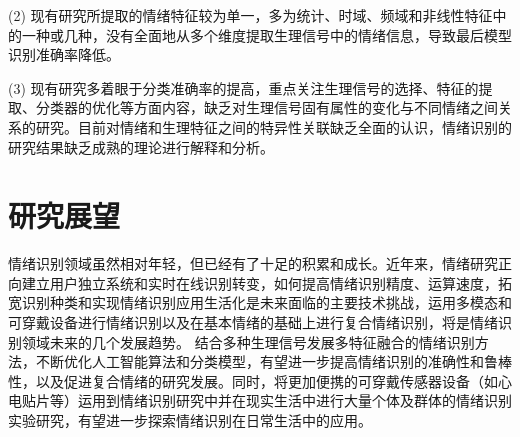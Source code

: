 (2) 现有研究所提取的情绪特征较为单一，多为统计、时域、频域和非线性特征中的一种或几种，没有全面地从多个维度提取生理信号中的情绪信息，导致最后模型识别准确率降低。

(3) 现有研究多着眼于分类准确率的提高，重点关注生理信号的选择、特征的提取、分类器的优化等方面内容，缺乏对生理信号固有属性的变化与不同情绪之间关系的研究。目前对情绪和生理特征之间的特异性关联缺乏全面的认识，情绪识别的研究结果缺乏成熟的理论进行解释和分析。


\section{研究展望}
情绪识别领域虽然相对年轻，但已经有了十足的积累和成长。近年来，情绪研究正向建立用户独立系统和实时在线识别转变，如何提高情绪识别精度、运算速度，拓宽识别种类和实现情绪识别应用生活化是未来面临的主要技术挑战，运用多模态和可穿戴设备进行情绪识别以及在基本情绪的基础上进行复合情绪识别，将是情绪识别领域未来的几个发展趋势。
结合多种生理信号发展多特征融合的情绪识别方法，不断优化人工智能算法和分类模型，有望进一步提高情绪识别的准确性和鲁棒性，以及促进复合情绪的研究发展。同时，将更加便携的可穿戴传感器设备（如心电贴片等）运用到情绪识别研究中并在现实生活中进行大量个体及群体的情绪识别实验研究，有望进一步探索情绪识别在日常生活中的应用。

\newpage
\begingroup
    \printbibliography[title={参考文献}]
\endgroup
